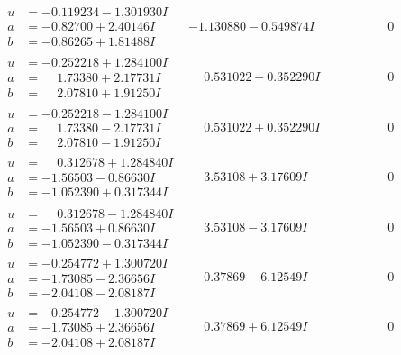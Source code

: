 \documentclass[1p]{elsarticle_modified}
\theoremstyle{definition}
\begin{document}
$$\begin{array}{c|c|c}
\begin{aligned}
u &= -0.119234 - 1.301930 I \\
a &= -0.82700 + 2.40146 I \\
b &= -0.86265 + 1.81488 I\end{aligned}
 & -1.130880 - 0.549874 I & \phantom{-0.000000 } 0 \\ \hline\begin{aligned}
u &= -0.252218 + 1.284100 I \\
a &= \phantom{-}1.73380 + 2.17731 I \\
b &= \phantom{-}2.07810 + 1.91250 I\end{aligned}
 & \phantom{-}0.531022 - 0.352290 I & \phantom{-0.000000 } 0 \\ \hline\begin{aligned}
u &= -0.252218 - 1.284100 I \\
a &= \phantom{-}1.73380 - 2.17731 I \\
b &= \phantom{-}2.07810 - 1.91250 I\end{aligned}
 & \phantom{-}0.531022 + 0.352290 I & \phantom{-0.000000 } 0 \\ \hline\begin{aligned}
u &= \phantom{-}0.312678 + 1.284840 I \\
a &= -1.56503 - 0.86630 I \\
b &= -1.052390 + 0.317344 I\end{aligned}
 & \phantom{-}3.53108 + 3.17609 I & \phantom{-0.000000 } 0 \\ \hline\begin{aligned}
u &= \phantom{-}0.312678 - 1.284840 I \\
a &= -1.56503 + 0.86630 I \\
b &= -1.052390 - 0.317344 I\end{aligned}
 & \phantom{-}3.53108 - 3.17609 I & \phantom{-0.000000 } 0 \\ \hline\begin{aligned}
u &= -0.254772 + 1.300720 I \\
a &= -1.73085 - 2.36656 I \\
b &= -2.04108 - 2.08187 I\end{aligned}
 & \phantom{-}0.37869 - 6.12549 I & \phantom{-0.000000 } 0 \\ \hline\begin{aligned}
u &= -0.254772 - 1.300720 I \\
a &= -1.73085 + 2.36656 I \\
b &= -2.04108 + 2.08187 I\end{aligned}
 & \phantom{-}0.37869 + 6.12549 I & \phantom{-0.000000 } 0\\

\end{array}$$
\end{document}
